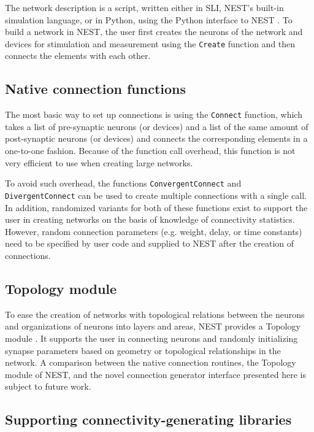 \documentclass{frontiersSCNS} %
\begin{document}
The network description is a script, written either in SLI, NEST's
built-in simulation language, or in Python, using the Python interface
to NEST \citep[PyNEST;][]{Eppler09_12}. To build a network in NEST,
the user first creates the neurons of the network and devices for
stimulation and measurement using the \verb|Create| function and then
connects the elements with each other.

\subsection{Native connection functions}

The most basic way to set up connections is using the \verb|Connect|
function, which takes a list of pre-synaptic neurons (or devices) and
a list of the same amount of post-synaptic neurons (or devices) and
connects the corresponding elements in a one-to-one fashion. Because
of the function call overhead, this function is not very efficient to
use when creating large networks.

To avoid such overhead, the functions \verb|ConvergentConnect| and
\verb|DivergentConnect| can be used to create multiple connections
with a single call. In addition, randomized variants for both of these
functions exist to support the user in creating networks on the basis
of knowledge of connectivity statistics. However, random connection
parameters (e.g. weight, delay, or time constants) need to be
specified by user code and supplied to NEST after the creation of
connections.

\subsection{Topology module}

To ease the creation of networks with topological relations between
the neurons and organizations of neurons into layers and areas, NEST
provides a Topology module \citep{Plesser_13}. It supports the user in
connecting neurons and randomly initializing synapse parameters based
on geometry or topological relationships in the network. A comparison
between the native connection routines, the Topology module of NEST,
and the novel connection generator interface presented here is
subject to future work.

\subsection{Supporting connectivity-generating libraries}
\end{document}

